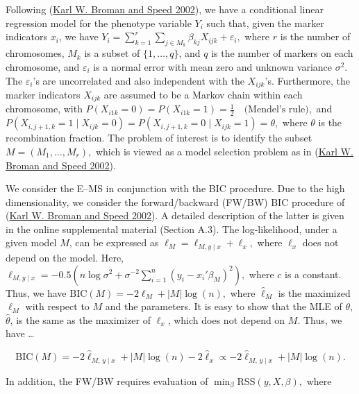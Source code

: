 \documentclass[
  12pt,
]{article}
\begin{document}
Following (\protect\hyperlink{ref-Broman2002ModelSelectionQTL}{Karl W.
Broman and Speed 2002}), we have a conditional linear regression model
for the phenotype variable \(Y_i\) such that, given the marker
indicators \(x_i\), we have
\(Y_i = \sum_{k=1}^{r} \sum_{j \in M_k} \beta_{kj} X_{ijk} + \varepsilon_i,\)
where \(r\) is the number of chromosomes, \(M_k\) is a subset of
\(\{1, \ldots, q\}\), and \(q\) is the number of markers on each
chromosome, and \(\varepsilon_i\) is a normal error with mean zero and
unknown variance \(\sigma^2\). The \(\varepsilon_i\)'s are uncorrelated
and also independent with the \(X_{ijk}\)'s. Furthermore, the marker
indicators \(X_{ijk}\) are assumed to be a Markov chain within each
chromosome, with
\(P(X_{i1k} = 0) = P(X_{i1k} = 1) = \tfrac{1}{2} \quad \text{(Mendel’s rule)},\)
and
\(P(X_{i,j+1,k} = 1 \mid X_{ijk} = 0)= P(X_{i,j+1,k} = 0 \mid X_{ijk} = 1) = \theta,\)
where \(\theta\) is the recombination fraction. The problem of interest
is to identify the subset \(M = (M_1, \ldots, M_r),\) which is viewed as
a model selection problem as in
(\protect\hyperlink{ref-Broman2002ModelSelectionQTL}{Karl W. Broman and
Speed 2002}).

We consider the E--MS in conjunction with the BIC procedure. Due to the
high dimensionality, we consider the forward/backward (FW/BW) BIC
procedure of (\protect\hyperlink{ref-Broman2002ModelSelectionQTL}{Karl
W. Broman and Speed 2002}). A detailed description of the latter is
given in the online supplemental material (Section A.3). The
log-likelihood, under a given model \(M\), can be expressed as
\(\ell_M = \ell_{M, y \mid x} + \ell_x,\) where \(\ell_x\) does not
depend on the model. Here,
\(\ell_{M, y \mid x}= -0.5(n\log \sigma^2 + \sigma^{-2} \sum_{i=1}^{n} (y_i - x_i' \beta_M)^2),\)
where \(c\) is a constant. Thus, we have
\(\text{BIC}(M) = -2 \ell_M + |M| \log(n),\) where \(\hat{\ell}_M\) is
the maximized \(\ell_M\) with respect to \(M\) and the parameters. It is
easy to show that the MLE of \(\theta\), \(\hat{\theta}\), is the same
as the maximizer of \(\ell_x\), which does not depend on \(M\). Thus, we
have \ldots{}

\begin{equation}
\text{BIC}(M)
= -2\hat{\ell}_{M,\,y\mid x} + |M|\log(n) - 2\hat{\ell}_x
\propto -2\hat{\ell}_{M,\,y\mid x} + |M|\log(n).
\end{equation}

In addition, the FW/BW requires evaluation of
\(\min_{\beta} \text{RSS}(y, X, \beta),\) where
\end{document}

